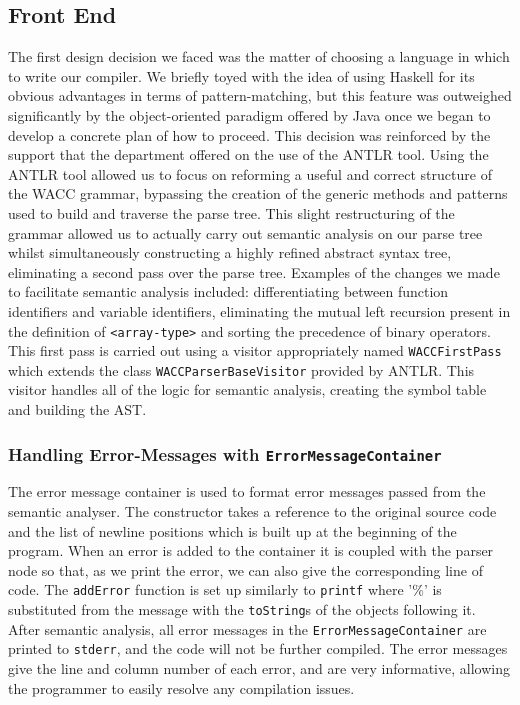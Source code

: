 \documentclass[a4wide, 10pt]{article}
\begin{document}
\subsection*{Front End}
The first design decision we faced was the matter of choosing a language in which to write our compiler. We briefly toyed with the idea of using Haskell for its obvious advantages in terms of pattern-matching, but this feature was outweighed significantly by the object-oriented paradigm offered by Java once we began to develop a concrete plan of how to proceed. This decision was reinforced by the support that the department offered on the use of the ANTLR tool. Using the ANTLR tool allowed us to focus on reforming a useful and correct structure of the WACC grammar, bypassing the creation of the generic methods and patterns used to build and traverse the parse tree. This slight restructuring of the grammar allowed us to actually carry out semantic analysis on our parse tree whilst simultaneously constructing a highly refined abstract syntax tree, eliminating a second pass over the parse tree. Examples of the changes we made to facilitate semantic analysis included: differentiating between function identifiers and variable identifiers, eliminating the mutual left recursion present in the definition of \texttt{<array-type>} and sorting the precedence of binary operators. This first pass is carried out using a visitor appropriately named \texttt{WACCFirstPass} which extends the class \texttt{WACCParserBaseVisitor} provided by ANTLR. This visitor handles all of the logic for semantic analysis, creating the symbol table and building the AST.  

\subsubsection*{Handling Error-Messages with \texttt{ErrorMessageContainer}}

The error message container is used to format error messages passed from the semantic analyser. The constructor takes a reference to the original source code and the list of newline positions which is built up at the beginning of the program. When an error is added to the container it is coupled with the parser node so that, as we print the error, we can also give the corresponding line of code. The \texttt{addError} function is set up similarly to \texttt{printf} where '\%' is substituted from the message with the \texttt{toString}s of the objects following it.\\
\indent After semantic analysis, all error messages in the \texttt{ErrorMessageContainer} are printed to \texttt{stderr}, and the code will not be further compiled. The error messages give the line and column number of each error, and are very informative, allowing the programmer to easily resolve any compilation issues.
\end{document}
